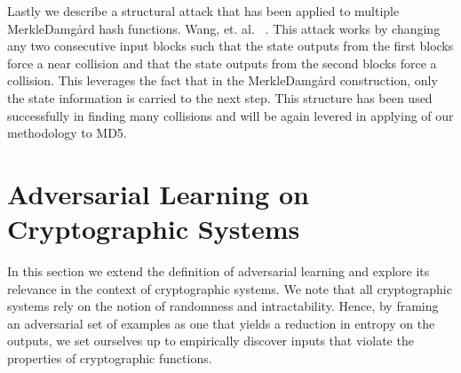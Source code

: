 \documentclass[letterpaper,twocolumn,10pt]{article}
\begin{document}
Lastly we describe a structural attack that has been applied to multiple Merkle{\textendash}Damg\r{a}rd hash functions. Wang, et. al. ~\cite{wang2005break}. This attack works by changing any two consecutive input blocks such that the state outputs from the first blocks force a near collision and that the state outputs from the second blocks force a collision. This leverages the fact that in the Merkle{\textendash}Damg\r{a}rd construction, only the state information is carried to the next step. This structure has been used successfully in finding many collisions and will be again levered in applying of our methodology to MD5. 

\section{Adversarial Learning on Cryptographic Systems} \label{cryptosys}

In this section we extend the definition of adversarial learning and explore its relevance in the context of cryptographic systems. We note that all cryptographic systems rely on the notion of randomness and intractability. Hence, by framing an adversarial set of examples as one that yields a reduction in entropy on the outputs, we set ourselves up to empirically discover inputs that violate the properties of cryptographic functions. 
\end{document}
